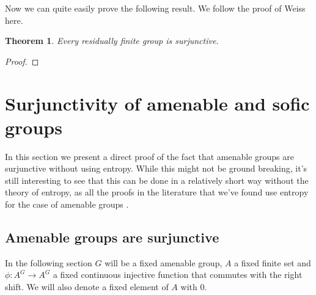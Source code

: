 \documentclass[titlepage, a4paper]{article}
\newtheorem{theorem}{Theorem}[section]
\theoremstyle{remark}
\begin{document}
    Now we can quite easily prove the following result. We follow the proof of Weiss \cite{weiss_2000} here.
    \begin{theorem} \label{thm:res_fin_surjunctive}
    Every residually finite group is surjunctive.
    \end{theorem}
    \begin{proof}
    
    \end{proof}

	
\section{Surjunctivity of amenable and sofic groups}
In this section we present a direct proof of the fact that amenable groups are surjunctive without using entropy. While this might not be ground breaking, it's still interesting to see that this can be done in a relatively short way without the theory of entropy, as all the proofs in the literature that we've found use entropy for the case of amenable groups \cite{weiss_2000} \cite{kerr_li_2010}.





\subsection{Amenable groups are surjunctive} \label{ssec:amenable_surjunctive}
In the following section $G$ will be a fixed amenable group, $A$ a fixed finite set and $\phi: A^{G} \to A^{G}$ a fixed continuous injective function that commutes with the right shift. 
We will also denote a fixed element of $A$ with $0$.
\end{document}

